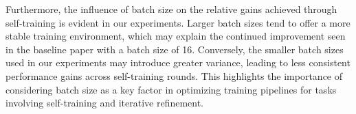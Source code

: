 Furthermore, the influence of batch size on the relative gains achieved through self-training is evident in our experiments. Larger batch sizes tend to offer a more stable training environment, which may explain the continued improvement seen in the baseline paper with a batch size of 16. Conversely, the smaller batch sizes used in our experiments may introduce greater variance, leading to less consistent performance gains across self-training rounds. This highlights the importance of considering batch size as a key factor in optimizing training pipelines for tasks involving self-training and iterative refinement.

%
